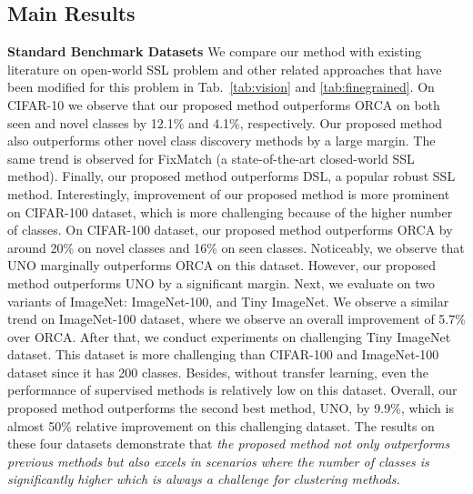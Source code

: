 \documentclass[runningheads]{eccv2022submission}
\begin{document}
\subsection{Main Results}
\noindent \textbf{Standard Benchmark Datasets}
We compare our method with existing literature on open-world SSL problem \cite{cao2022openworld} and other related approaches that have been modified for this problem in Tab.~\ref{tab:vision} and \ref{tab:finegrained}. On CIFAR-10 we observe that our proposed method outperforms ORCA \cite{cao2022openworld} on both seen and novel classes by 12.1\% and 4.1\%, respectively. Our proposed method also outperforms other novel class discovery methods \cite{han2019learning,Han2020Automatically,fini2021unified} by a large margin. The same trend is observed for FixMatch \cite{sohn2020fixmatch} (a state-of-the-art closed-world SSL method). Finally, our proposed method outperforms DSL\cite{guo2020safe}, a popular robust SSL method. Interestingly, improvement of our proposed method is more prominent on CIFAR-100 dataset, which is more challenging because of the higher number of classes. On CIFAR-100 dataset, our proposed method outperforms ORCA by around 20\% on novel classes and 16\% on seen classes. Noticeably, we observe that UNO\cite{fini2021unified} marginally outperforms ORCA on this dataset. However, our proposed method outperforms UNO by a significant margin. Next, we evaluate on two variants of ImageNet: ImageNet-100, and Tiny ImageNet. We observe a similar trend on ImageNet-100 dataset, where we observe an overall improvement of 5.7\% over ORCA. After that, we conduct experiments on challenging Tiny ImageNet dataset. This dataset is more challenging than CIFAR-100 and ImageNet-100 dataset since it has 200 classes. Besides, without transfer learning, even the performance of supervised methods is relatively low on this dataset. Overall, our proposed method outperforms the second best method, UNO, by 9.9\%, which is almost 50\% relative improvement on this challenging dataset. The results on these four datasets demonstrate that \emph{the proposed method not only outperforms previous methods but also excels in scenarios where the number of classes is significantly higher which is always a challenge for clustering methods.}   
\end{document}
